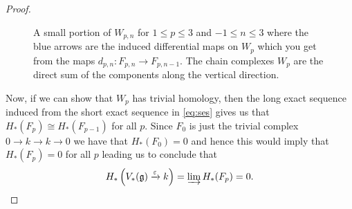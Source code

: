 \begin{proof}
\begin{figure}[t]
\begin{center}
    \end{center}
    \caption{A small portion of $ W_{p, n} $ for $ 1 \leq p \leq 3 $ and $ -1 \leq n \leq 3 $ where the blue arrows are the induced differential maps on $ W_p $ which you get from the maps $ d_{p, n}:F_{p, n} \to F_{p, n-1} $. The chain complexes $ W_p $ are the direct sum of the components along the vertical direction.}\label{fig:filtration}
  \end{figure}


  Now, if we can show that $ W_p $ has trivial homology, then the long exact sequence induced from the short exact sequence in \ref{eq:ses} gives us that $ H_*(F_{p}) \cong H_{*}(F_{p-1}) $ for all $ p $. Since $ F_0 $ is just the trivial complex $ 0 \to k \to k \to 0 $ we have that $ H_*(F_0) = 0 $ and hence this would imply that $ H_*(F_p) = 0 $ for all $ p $ leading us to conclude that
  \begin{equation}
    H_*\left( V_*(\mathfrak{g})\xrightarrow{\epsilon} k \right) = \varinjlim{H_*(F_p)} = 0.
  \end{equation}


\end{proof}
